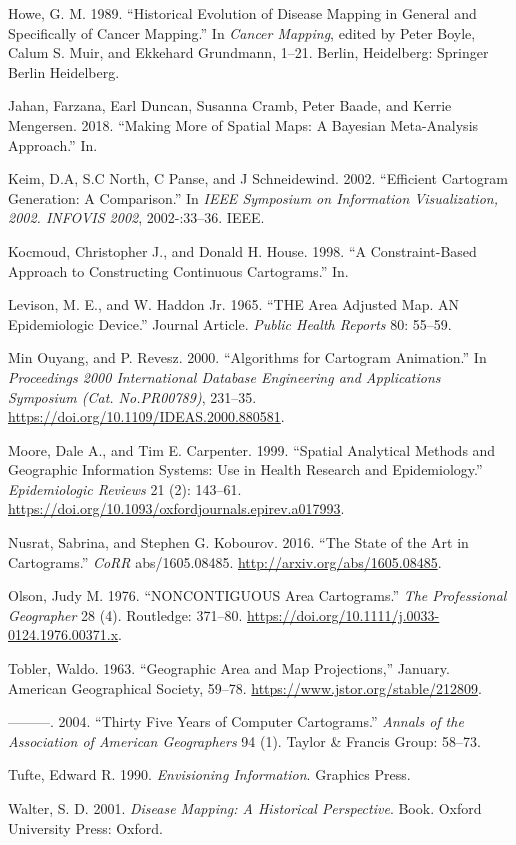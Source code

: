 \documentclass[11pt,]{article}
\begin{document}
\leavevmode\hypertarget{ref-HEDP}{}%
Howe, G. M. 1989. ``Historical Evolution of Disease Mapping in General
and Specifically of Cancer Mapping.'' In \emph{Cancer Mapping}, edited
by Peter Boyle, Calum S. Muir, and Ekkehard Grundmann, 1--21. Berlin,
Heidelberg: Springer Berlin Heidelberg.

\leavevmode\hypertarget{ref-MTMSIH}{}%
Jahan, Farzana, Earl Duncan, Susanna Cramb, Peter Baade, and Kerrie
Mengersen. 2018. ``Making More of Spatial Maps: A Bayesian Meta-Analysis
Approach.'' In.

\leavevmode\hypertarget{ref-ECGC}{}%
Keim, D.A, S.C North, C Panse, and J Schneidewind. 2002. ``Efficient
Cartogram Generation: A Comparison.'' In \emph{IEEE Symposium on
Information Visualization, 2002. INFOVIS 2002}, 2002-:33--36. IEEE.

\leavevmode\hypertarget{ref-CBATCC}{}%
Kocmoud, Christopher J., and Donald H. House. 1998. ``A Constraint-Based
Approach to Constructing Continuous Cartograms.'' In.

\leavevmode\hypertarget{ref-TAAM}{}%
Levison, M. E., and W. Haddon Jr. 1965. ``THE Area Adjusted Map. AN
Epidemiologic Device.'' Journal Article. \emph{Public Health Reports}
80: 55--59.

\leavevmode\hypertarget{ref-ACA}{}%
Min Ouyang, and P. Revesz. 2000. ``Algorithms for Cartogram Animation.''
In \emph{Proceedings 2000 International Database Engineering and
Applications Symposium (Cat. No.PR00789)}, 231--35.
\url{https://doi.org/10.1109/IDEAS.2000.880581}.

\leavevmode\hypertarget{ref-SAMGIS}{}%
Moore, Dale A., and Tim E. Carpenter. 1999. ``Spatial Analytical Methods
and Geographic Information Systems: Use in Health Research and
Epidemiology.'' \emph{Epidemiologic Reviews} 21 (2): 143--61.
\url{https://doi.org/10.1093/oxfordjournals.epirev.a017993}.

\leavevmode\hypertarget{ref-SAIC}{}%
Nusrat, Sabrina, and Stephen G. Kobourov. 2016. ``The State of the Art
in Cartograms.'' \emph{CoRR} abs/1605.08485.
\url{http://arxiv.org/abs/1605.08485}.

\leavevmode\hypertarget{ref-NAC}{}%
Olson, Judy M. 1976. ``NONCONTIGUOUS Area Cartograms.'' \emph{The
Professional Geographer} 28 (4). Routledge: 371--80.
\url{https://doi.org/10.1111/j.0033-0124.1976.00371.x}.

\leavevmode\hypertarget{ref-GAMP}{}%
Tobler, Waldo. 1963. ``Geographic Area and Map Projections,'' January.
American Geographical Society, 59--78.
\url{https://www.jstor.org/stable/212809}.

\leavevmode\hypertarget{ref-TFYCC}{}%
---------. 2004. ``Thirty Five Years of Computer Cartograms.''
\emph{Annals of the Association of American Geographers} 94 (1). Taylor
\& Francis Group: 58--73.

\leavevmode\hypertarget{ref-EI}{}%
Tufte, Edward R. 1990. \emph{Envisioning Information}. Graphics Press.

\leavevmode\hypertarget{ref-DMAHP}{}%
Walter, S. D. 2001. \emph{Disease Mapping: A Historical Perspective}.
Book. Oxford University Press: Oxford.
\end{document}
